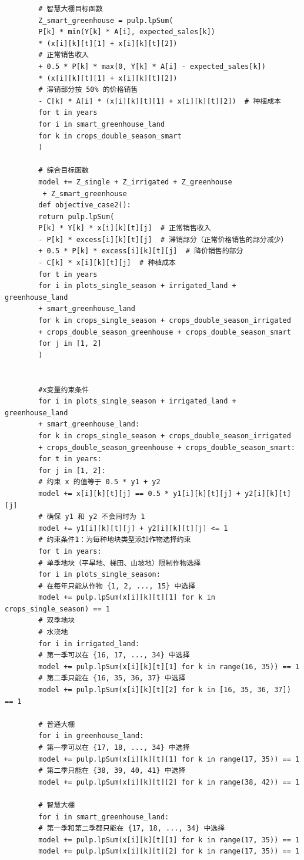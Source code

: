 \documentclass[12pt]{ctexart}
\begin{document}
\begin{verbatim}
		# 智慧大棚目标函数
		Z_smart_greenhouse = pulp.lpSum(
		P[k] * min(Y[k] * A[i], expected_sales[k]) 
		* (x[i][k][t][1] + x[i][k][t][2])
		# 正常销售收入
		+ 0.5 * P[k] * max(0, Y[k] * A[i] - expected_sales[k]) 
		* (x[i][k][t][1] + x[i][k][t][2])
		# 滞销部分按 50% 的价格销售
		- C[k] * A[i] * (x[i][k][t][1] + x[i][k][t][2])  # 种植成本
		for t in years
		for i in smart_greenhouse_land
		for k in crops_double_season_smart
		)
		
		# 综合目标函数
		model += Z_single + Z_irrigated + Z_greenhouse
		 + Z_smart_greenhouse
		def objective_case2():
		return pulp.lpSum(
		P[k] * Y[k] * x[i][k][t][j]  # 正常销售收入
		- P[k] * excess[i][k][t][j]  # 滞销部分（正常价格销售的部分减少）
		+ 0.5 * P[k] * excess[i][k][t][j]  # 降价销售的部分
		- C[k] * x[i][k][t][j]  # 种植成本
		for t in years
		for i in plots_single_season + irrigated_land + greenhouse_land 
		+ smart_greenhouse_land
		for k in crops_single_season + crops_double_season_irrigated 
		+ crops_double_season_greenhouse + crops_double_season_smart
		for j in [1, 2]
		)
		
		
		#x变量约束条件
		for i in plots_single_season + irrigated_land + greenhouse_land 
		+ smart_greenhouse_land:
		for k in crops_single_season + crops_double_season_irrigated
		+ crops_double_season_greenhouse + crops_double_season_smart:
		for t in years:
		for j in [1, 2]:
		# 约束 x 的值等于 0.5 * y1 + y2
		model += x[i][k][t][j] == 0.5 * y1[i][k][t][j] + y2[i][k][t][j]
		# 确保 y1 和 y2 不会同时为 1
		model += y1[i][k][t][j] + y2[i][k][t][j] <= 1
		# 约束条件1：为每种地块类型添加作物选择约束
		for t in years:
		# 单季地块（平旱地、梯田、山坡地）限制作物选择
		for i in plots_single_season:
		# 在每年只能从作物 {1, 2, ..., 15} 中选择
		model += pulp.lpSum(x[i][k][t][1] for k in crops_single_season) == 1
		# 双季地块
		# 水浇地
		for i in irrigated_land:
		# 第一季可以在 {16, 17, ..., 34} 中选择
		model += pulp.lpSum(x[i][k][t][1] for k in range(16, 35)) == 1
		# 第二季只能在 {16, 35, 36, 37} 中选择
		model += pulp.lpSum(x[i][k][t][2] for k in [16, 35, 36, 37]) == 1
		
		# 普通大棚
		for i in greenhouse_land:
		# 第一季可以在 {17, 18, ..., 34} 中选择
		model += pulp.lpSum(x[i][k][t][1] for k in range(17, 35)) == 1
		# 第二季只能在 {38, 39, 40, 41} 中选择
		model += pulp.lpSum(x[i][k][t][2] for k in range(38, 42)) == 1
		
		# 智慧大棚
		for i in smart_greenhouse_land:
		# 第一季和第二季都只能在 {17, 18, ..., 34} 中选择
		model += pulp.lpSum(x[i][k][t][1] for k in range(17, 35)) == 1
		model += pulp.lpSum(x[i][k][t][2] for k in range(17, 35)) == 1
		

\end{verbatim}
\end{document}
